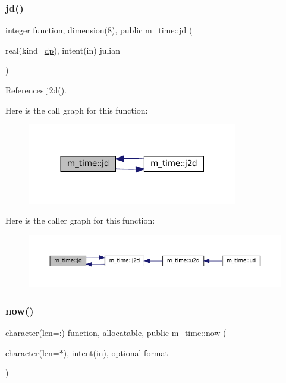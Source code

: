 \subsubsection{\texorpdfstring{jd()}{jd()}}
{\footnotesize\ttfamily integer function, dimension(8), public m\+\_\+time\+::jd (\begin{DoxyParamCaption}\item[{real(kind=\mbox{\hyperlink{namespacem__time_a95f16e7435244d114f0a451625dc189a}{dp}}), intent(in)}]{julian }\end{DoxyParamCaption})}



References j2d().

Here is the call graph for this function\+:\nopagebreak
\begin{figure}[H]
\begin{center}
\leavevmode
\includegraphics[width=260pt]{namespacem__time_a6c3297c41c6f58f8139c48466a37f292_cgraph}
\end{center}
\end{figure}
Here is the caller graph for this function\+:\nopagebreak
\begin{figure}[H]
\begin{center}
\leavevmode
\includegraphics[width=350pt]{namespacem__time_a6c3297c41c6f58f8139c48466a37f292_icgraph}
\end{center}
\end{figure}
\mbox{\label{namespacem__time_a6b5e87be0e510ff268c1ecfbf67a3bdb}} 
\subsubsection{\texorpdfstring{now()}{now()}}
{\footnotesize\ttfamily character(len=\+:) function, allocatable, public m\+\_\+time\+::now (\begin{DoxyParamCaption}\item[{character(len=$\ast$), intent(in), optional}]{format }\end{DoxyParamCaption})}



